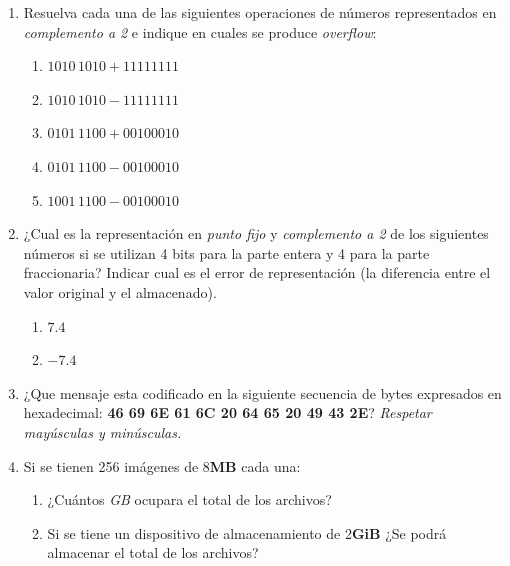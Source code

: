 \documentclass[12pt]{article}
\begin{document}
\begin{enumerate}
\begin{enumerate}
        \end{enumerate}

    \item Resuelva cada una de las siguientes operaciones de números
    representados en \emph{complemento a 2} e indique en cuales se produce
    \emph{overflow}:

        \begin{enumerate}

            \item $1010\,1010 + 1111 1111$
            \item $1010\,1010 - 1111 1111$
            \item $0101\,1100 + 0010 0010$
            \item $0101\,1100 - 0010 0010$
            \item $1001\,1100 - 0010 0010$

        \end{enumerate}

    \item ¿Cual es la representación en \emph{punto fijo} y \emph{complemento
        a 2} de los siguientes números si se utilizan 4 bits para la parte
        entera y 4 para la parte fraccionaria? Indicar cual es el error de
        representación (la diferencia entre el valor original y el
        almacenado).

        \begin{enumerate}

            \item $7.4$

            \item $-7.4$

        \end{enumerate}

    \item ¿Que mensaje esta codificado en la siguiente secuencia de bytes
        expresados en hexadecimal: \textbf{46 69 6E 61 6C 20 64 65  20 49 43 2E}?
        \emph{Respetar mayúsculas y minúsculas.}

    \item Si se tienen 256 imágenes de 8\textbf{MB} cada una:

        \begin{enumerate}

            \item ¿Cuántos \emph{GB} ocupara el total de los archivos?

            \item Si se tiene un dispositivo de almacenamiento de
            2\textbf{GiB} ¿Se podrá almacenar el total de los archivos?


\end{enumerate}
\end{enumerate}
\end{document}
